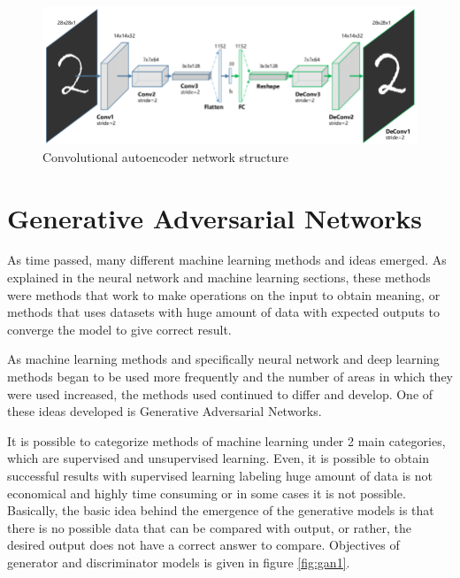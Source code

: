 \begin{figure}[h!]
    \centering
    \includegraphics[width=13cm]{figures/chapter3/mnist_autoencoder.png}
    \vspace*{3mm}
    \caption{Convolutional autoencoder network structure \cite{autoencoders}}
    \label{fig:mnist_autoencoder}
\end{figure}

\section{Generative Adversarial Networks}

As time passed, many different machine learning methods and ideas emerged. As explained in the neural network and machine learning sections, these methods were methods that work to make operations on the input to obtain meaning, or methods that uses datasets with huge amount of data with expected outputs to converge the model to give correct result.

As machine learning methods and specifically neural network and deep learning methods began to be used more frequently and the number of areas in which they were used increased, the methods used continued to differ and develop. One of these ideas developed is Generative Adversarial Networks.

It is possible to categorize methods of machine learning under 2 main categories, which are supervised and unsupervised learning. Even, it is possible to obtain successful results with supervised learning labeling huge amount of data is not economical and highly time consuming or in some cases it is not possible. Basically, the basic idea behind the emergence of the generative models is that there is no possible data that can be compared with output, or rather, the desired output does not have a correct answer to compare. Objectives of generator and discriminator models is given in figure \ref{fig:gan1}.

